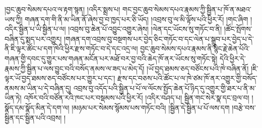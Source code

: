 །བྱང་ཆུབ་སེམས་དཔའ་ལ་རྟག་སྙན། །འདིར་སྨྲས་པ། གང་བྱང་ཆུབ་སེམས་དཔའ་རྣམས་ཀྱི་སྦྱིན་པ་ཁོ་ན་མཐའ་ཡས་ཀྱི། གཞན་དག་གི་ནི་མ་ཡིན་ནོ་ཞེས་བྱ་བ་ཁྱད་པར་ཅི་ཡོད། །འབྲས་བུ་ལ་མི་ལྟོས་པའི་ཕྱིར་རོ། །གང་ཞིག །འདིར་སྦྱིན་པ་ཡི་སྦྱིན་པ་ལ། །འབྲས་བུ་ཆེན་པོ་འབྱུང་འགྱུར་ཞེས། །ལེན་དང་ཡོངས་སུ་གཏོང་བ་ནི། །ཚོང་སྤོགས་བཞིན་དུ་སྨད་པར་འགྱུར། །གཞན་དག་འབྲས་བུ་བསྔགས་པར་བྱེད་ཅིང་གཏོང་བ་དང་ལེན་པ་སྒྲུབ་པར་བྱེད་པ་དེ་ནི་ཇི་ལྟར་ཚོང་པ་དག་ཁེའི་ཕྱིར་རྫས་གཏོང་བ་དེ་དང་འདྲ་ལ། བྱང་ཆུབ་སེམས་དཔའ་རྣམས་ནི་སྙིང་རྗེ་ཆེན་པོའི་གཞན་གྱི་དབང་དུ་གྱུར་པས་གཞན་མངོན་པར་མཐོ་བར་བྱ་བའི་ཆེད་ཁོ་ནར་ཡོངས་སུ་གཏོང་སྟེ། དེའི་ཕྱིར་དེ་རྣམས་ཀྱི་སྦྱིན་པ་ལས་བྱུང་བའི་བསོད་ནམས་ལ་ཟད་པ་མེད་དོ། །ཡོ་བྱད་ཐམས་ཅད་བཙོངས་པའི་ཁེ་བཞིན་ནོ། །ཇི་ལྟར་ཡོ་བྱད་ཐམས་ཅད་བཙོངས་པར་གྱུར་པ་དང་། རྫས་དང་བཅས་པའི་ཚོང་པ་ལ་ཁེ་ཙམ་ཁོ་ནར་འགྱུར་གྱི་བསོད་ནམས་མ་ཡིན་པ་དེ་བཞིན་དུ། འབྲས་བུ་འདོད་པའི་སྦྱིན་པ་པོ་ལ་ལོངས་སྤྱོད་ཆེན་པོ་ཉིད་དུ་འགྱུར་གྱི་ཐར་པ་ནི་མ་ཡིན་ཏེ། འཁོར་བའི་བཙོན་རའི་ཁང་པར་བསྡམས་པའི་ཕྱིར་རོ། །འདིར་བཤད་པ། སྦྱིན་གང་སེར་སྣ་དང་བྲལ་བ། །སྣོད་དམ་སྣོད་མིན་དེ་དག་ལ། །མཉམ་པར་སེམས་སྙོམས་པས་གཏོང་བའི། །སྦྱིན་དེ་སྦྱིན་པ་པོ་ལས་དག །བརྩེ་བས་སྦྱིན་དང་སྦྱིན་པའི་འབྲས། །

